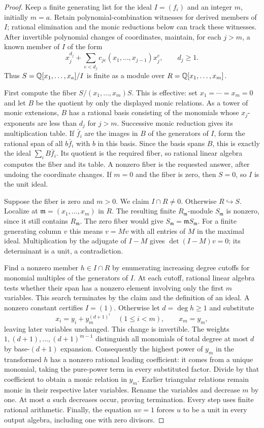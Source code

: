 \begin{proof}
Keep a finite generating list for the ideal $I=(f_i)$ and an integer $m$,
initially $m=a$.  Retain polynomial-combination witnesses for derived
members of $I$; rational elimination and the monic reductions below
can track these witnesses.
After invertible polynomial changes of coordinates, maintain, for
each $j>m$, a known member of $I$ of the form
\[
 x_j^{d_j}+\sum_{e<d_j}c_{je}(x_1,\ldots,x_{j-1})x_j^e,
 \qquad d_j\ge1.
\]
Thus $S=\mathbb Q[x_1,\ldots,x_a]/I$ is finite as a module over
$R=\mathbb Q[x_1,\ldots,x_m]$.

First compute the fiber $S/(x_1,\ldots,x_m)S$.  This is effective:
set $x_1=\cdots=x_m=0$ and let $B$ be the quotient by only the
displayed monic relations.  As a tower of monic extensions, $B$ has
a rational basis consisting of the monomials whose $x_j$-exponents
are less than $d_j$ for $j>m$.  Successive monic reduction gives its
multiplication table.  If $\bar f_i$ are the images in $B$ of the
generators of $I$, form the rational span of all $b\bar f_i$ with
$b$ in this basis.  Since the basis spans $B$, this is exactly the
ideal $\sum_i B\bar f_i$.  Its quotient is the required fiber, so
rational linear algebra computes the fiber and its table.  A nonzero
fiber is the requested answer, after undoing the coordinate changes.
If $m=0$ and the fiber is zero, then $S=0$, so $I$ is the unit ideal.

Suppose the fiber is zero and $m>0$.  We claim $I\cap R\ne0$.
Otherwise $R\hookrightarrow S$.  Localize at
$\mathfrak m=(x_1,\ldots,x_m)$ in $R$.  The resulting finite
$R_{\mathfrak m}$-module $S_{\mathfrak m}$ is nonzero, since it still
contains $R_{\mathfrak m}$.  The zero fiber would give
$S_{\mathfrak m}=\mathfrak mS_{\mathfrak m}$.  For a finite generating
column $v$ this means $v=Mv$ with all entries of $M$ in the maximal
ideal.  Multiplication by the adjugate of $I-M$ gives
$\det(I-M)v=0$; its determinant is a unit, a contradiction.

Find a nonzero member $h\in I\cap R$ by enumerating increasing degree
cutoffs for monomial multiples of the generators of $I$.  At each
cutoff, rational linear algebra tests whether their span has a
nonzero element involving only the first $m$ variables.  This search
terminates by the claim and the definition of an ideal.  A nonzero
constant certifies $I=(1)$.  Otherwise let $d=\deg h\ge1$ and substitute
\[
 x_i=y_i+y_m^{(d+1)^i}\quad(1\le i<m),\qquad x_m=y_m,
\]
leaving later variables unchanged.  This change is invertible.
The weights $1,(d+1),\ldots,(d+1)^{m-1}$ distinguish all monomials of
total degree at most $d$ by base-$(d+1)$ expansion.  Consequently the
highest power of $y_m$ in the transformed $h$ has a nonzero rational
leading coefficient: it comes from a unique monomial, taking the
pure-power term in every substituted factor.  Divide by that
coefficient to obtain a monic relation in $y_m$.  Earlier triangular
relations remain monic in their respective later variables.  Rename
the variables and decrease $m$ by one.  At most $a$ such decreases
occur, proving termination.  Every step uses finite rational
arithmetic.  Finally, the equation $uv=1$ forces $u$ to be a unit in
every output algebra, including one with zero divisors.
\end{proof}

